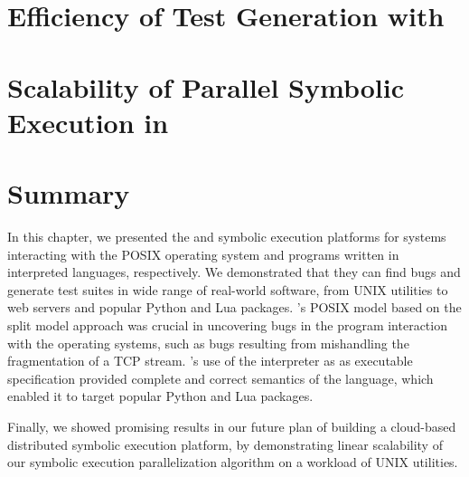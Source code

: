 \section{Efficiency of Test Generation with \chef}
\label{sec:eval:chef-efficiency}


\section{Scalability of Parallel Symbolic Execution in \cnine}
\label{sec:eval:cnine-efficiency}


\vspace{-1em}

\section{Summary}

In this chapter, we presented the \cnine and \chef symbolic execution platforms for systems interacting with the POSIX operating system and programs written in interpreted languages, respectively.
%
We demonstrated that they can find bugs and generate test suites in wide range of real-world software, from UNIX utilities to web servers and popular Python and Lua packages.
%
\cnine's POSIX model based on the split model approach was crucial in uncovering bugs in the program interaction with the operating systems, such as bugs resulting from mishandling the fragmentation of a TCP stream.
%
\chef's use of the interpreter as as executable specification provided complete and correct semantics of the language, which enabled it to target popular Python and Lua packages.

Finally, we showed promising results in our future plan of building a cloud-based distributed symbolic execution platform, by demonstrating linear scalability of our symbolic execution parallelization algorithm on a workload of UNIX utilities.


